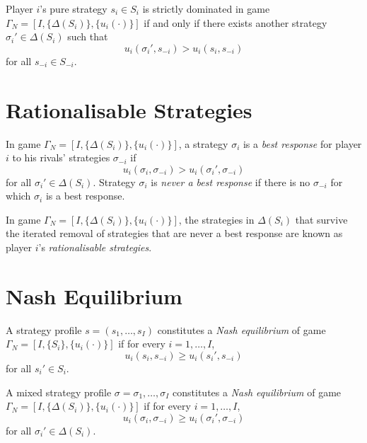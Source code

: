 \begin{prop}
    Player $i$'s pure strategy $s_i \in S_i$ is strictly dominated in game $\Gamma_N = [I, \{\Delta(S_i)\}, \{u_i(\cdot)\}]$ if and only if there exists another strategy $\sigma_i' \in \Delta(S_i)$ such that 
    \begin{equation*}
        u_i (\sigma_i', s_{-i}) > u_i (s_i, s_{-i})
    \end{equation*}
    for all $s_{-i} \in S_{-i}$.
\end{prop}


\section{Rationalisable Strategies}

\begin{defn}
    In game $\Gamma_N = [I, \{\Delta(S_i)\}, \{u_i(\cdot)\}]$, a strategy $\sigma_i$ is a \emph{best response} for player $i$ to his rivals' strategies $\sigma_{-i}$ if
    \begin{equation*}
        u_i (\sigma_i, \sigma_{-i}) > u_i (\sigma_i', \sigma_{-i})
    \end{equation*}
    for all $\sigma_i' \in \Delta(S_i)$. Strategy $\sigma_i$ is \emph{never a best response} if there is no $\sigma_{-i}$ for which $\sigma_i$ is a best response.
\end{defn}

\begin{defn}
    In game $\Gamma_N = [I, \{\Delta(S_i)\}, \{u_i(\cdot)\}]$, the strategies in $\Delta(S_i)$ that survive the iterated removal of strategies that are never a best response are known as player $i$'s \emph{rationalisable strategies}.
\end{defn}


\section{Nash Equilibrium}

\begin{defn}
    A strategy profile $s = (s_1, \dots, s_I)$ constitutes a \emph{Nash equilibrium} of game $\Gamma_N = [I, \{S_i\}, \{u_i(\cdot)\}]$ if for every $i = 1, \dots, I$,
    \begin{equation*}
        u_i (s_i, s_{-i}) \geq u_i (s_i', s_{-i})
    \end{equation*}
    for all $s_i' \in S_i$.
\end{defn}

\begin{defn}
    A mixed strategy profile $\sigma = \sigma_1, \dots, \sigma_I$ constitutes a \emph{Nash equilibrium} of game $\Gamma_N = [I, \{\Delta(S_i)\}, \{u_i(\cdot)\}]$ if for every $i = 1, \dots, I$,
    \begin{equation*}
        u_i (\sigma_i, \sigma_{-i}) \geq u_i (\sigma_i', \sigma_{-i})
    \end{equation*}
    for all $\sigma_i' \in \Delta(S_i)$.
\end{defn}

